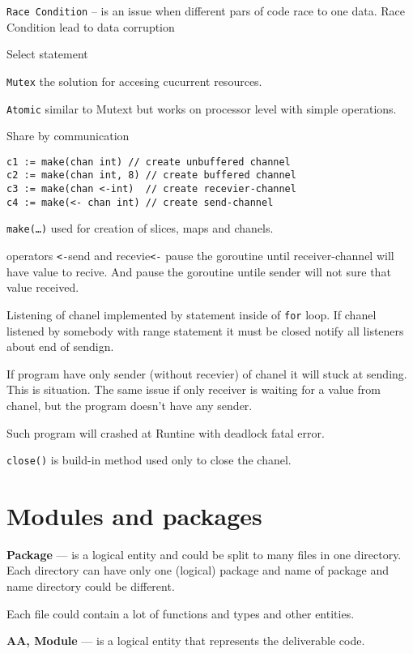 \documentclass[12pt]{article}
\begin{document}
\texttt{Race Condition} -- is an issue when different pars of code race to one data.
Race Condition lead to data corruption

Select statement

\texttt{Mutex} the solution for accesing cucurrent resources.

\texttt{Atomic} similar to Mutext but works on processor level with simple operations.

Share by communication

\begin{lstlisting}
c1 := make(chan int) // create unbuffered channel
c2 := make(chan int, 8) // create buffered channel
c3 := make(chan <-int)  // create recevier-channel
c4 := make(<- chan int) // create send-channel
\end{lstlisting}

\texttt{make(\ldots)} used for creation of slices, maps and chanels.

operators \texttt{<-}send and recevie\texttt{<-} pause the goroutine until receiver-channel will have value to recive.
And pause the goroutine untile sender will not sure that value received.

Listening of chanel implemented by  statement inside of \texttt{for} loop.
If chanel listened by somebody with range statement it must be closed notify all listeners about end of sendign.

If program have only sender (without recevier) of chanel it will stuck at sending. This is  situation.
The same issue if only receiver is waiting for a value from chanel, but the program doesn't have any sender.

Such program will crashed at Runtine with deadlock fatal error.

\texttt{close()} is build-in method used only to close the chanel.

\section{Modules and packages}

\textbf{Package} — is a logical entity and could be split to many files in one
directory.
Each directory can have only one (logical) package and name of
package and name directory could be different.

Each file could contain a lot of functions and types and other entities.


\textbf{AA, Module} — is a logical entity that represents the deliverable code.
\end{document}
